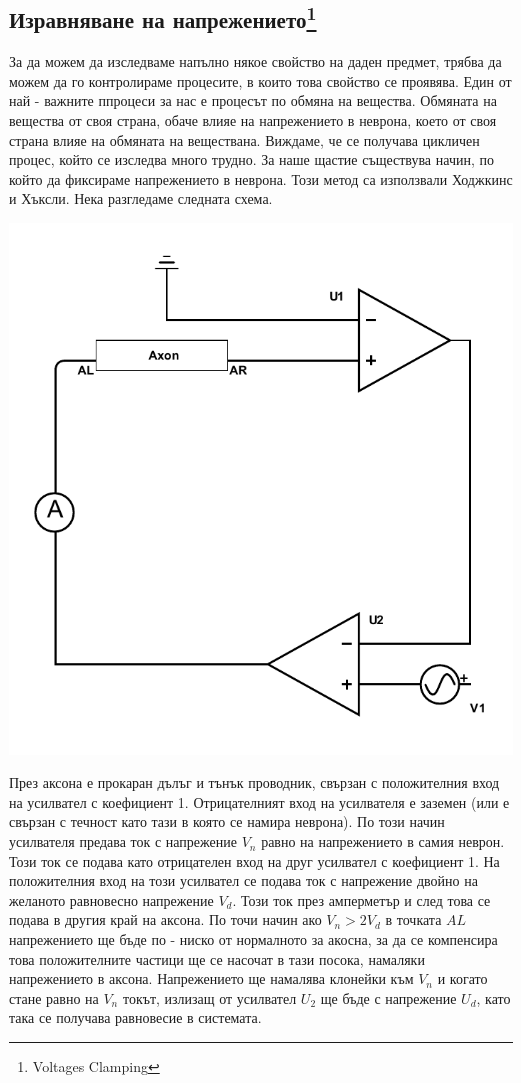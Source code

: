 \documentclass{article}
\begin{document}
\subsection[Изравняване на напрежението]{Изравняване на напрежението\footnote{Voltages Clamping}}
    За да можем да изследваме напълно някое свойство на даден предмет, трябва да можем да го контролираме процесите, в които това свойство
    се проявява.  Един от най - важните ппроцеси за нас е процесът по обмяна на вещества.  Обмяната на вещества от своя страна, обаче влияе
    на напрежението в неврона, което от своя страна влияе на обмяната на веществана. Виждаме, че се получава цикличен процес, който се
    изследва много трудно. За наше щастие съществува начин, по който да фиксираме напрежението в неврона. Този метод са използвали Ходжкинс
    и Хъксли. Нека разгледаме следната схема.
    \begin{center}
        \includegraphics{./schemas/voltage-clamp.pdf}
    \end{center}
    През аксона е прокаран дълъг и тънък проводник, свързан с положителния вход на усилвател с коефициент 1. Отрицателният вход на усилвателя
    е заземен (или е свързан с течност като тази в която се намира неврона). По този начин усилвателя предава ток с напрежение $V_n$ равно на
    напрежението в самия неврон. Този ток се подава като отрицателен вход на друг усилвател с коефициент 1. На положителния вход на този
    усилвател се подава ток с напрежение двойно на желаното равновесно напрежение $V_d$. Този ток през амперметър и след това се подава в
    другия край на аксона. По точи начин ако $V_n > 2V_d$ в точката $AL$ напрежението ще бъде по - ниско от нормалното за акосна, за да се
    компенсира това положителните частици ще се насочат в тази посока, намаляки напрежението в аксона. Напрежението ще намалява клонейки към
    $V_n$ и когато стане равно на $V_n$ токът, излизащ от усилвател $U_2$ ще бъде с напрежение $U_d$, като така се получава равновесие в
    системата.
\end{document}
